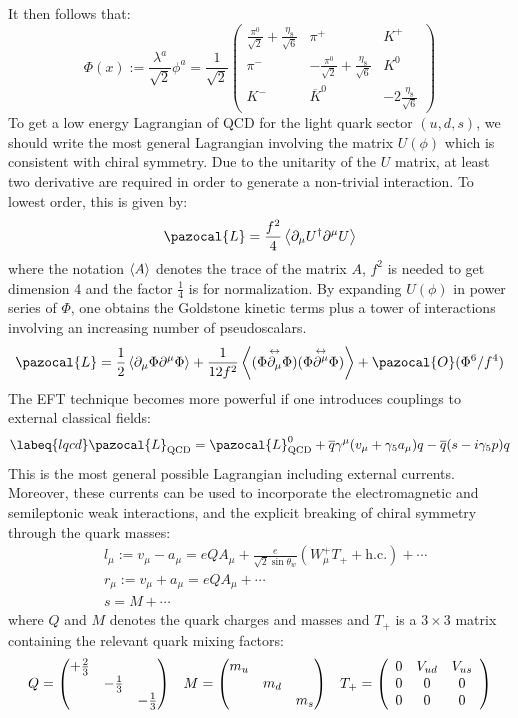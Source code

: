 \documentclass[../main.tex]{subfiles}
\begin{document}
It then follows that:
\[
\Phi(x):=\frac{\lambda^a}{\sqrt{2}}\phi^a=\frac{1}{\sqrt{2}}\left(\begin{array}{ccc}
    \frac{\pi^0}{\sqrt{2}}+\frac{\eta_8}{\sqrt{6}} & \pi^+ & K^+ \\
    \pi^- & -\frac{\pi^0}{\sqrt{2}}+\frac{\eta_8}{\sqrt{6}} & K^0 \\
    K^- & \overline{K}^0 & -2\frac{\eta_8}{\sqrt{6}}
\end{array}\right)
\]
To get a low energy Lagrangian of QCD for the light quark sector $(u, d, s)$, we should write the most general Lagrangian involving the matrix $U(\phi)$ which is consistent with chiral symmetry. Due to the unitarity of the $U$ matrix, at least two derivative are required in order to generate a non-trivial interaction. To lowest order, this is given by:
\[
\pazocal{L}=\frac{f^2}{4}\Braket{\partial_\mu U^\dagger\partial^\mu U}
\]
where the notation $\Braket{A}$ denotes the trace of the matrix $A$, $f^2$ is needed to get dimension 4 and the factor $\frac{1}{4}$ is for normalization. By expanding $U(\phi)$ in power series of $\Phi$, one obtains the Goldstone kinetic terms plus a tower of interactions involving an increasing number of pseudoscalars. 
\[
\pazocal{L}=\frac{1}{2}\Braket{\partial_\mu\Phi\partial^\mu\Phi}+\frac{1}{12f^2}\Braket{(\Phi\overset{\leftrightarrow}{\partial_\mu}\Phi)(\Phi\overset{\leftrightarrow}{\partial^\mu}\Phi)}+\pazocal{O}(\Phi^6/f^4)
\]
The EFT technique becomes more powerful if one introduces couplings to external classical fields:
\begin{equation}
\labeq{lqcd}
\pazocal{L}_{\text{QCD}}=\pazocal{L}_{\text{QCD}}^0+\overline{q}\gamma^\mu(v_\mu+\gamma_5a_\mu)q-\overline{q}(s-i\gamma_5p)q
\end{equation}
This is the most general possible Lagrangian including external currents. Moreover, these currents can be used to incorporate the electromagnetic and semileptonic weak interactions, and the explicit breaking of chiral symmetry through the quark masses:
\[
\begin{aligned}
&l_\mu:=v_\mu-a_\mu=eQA_\mu+\frac{e}{\sqrt{2}\sin\theta_w}(W_\mu^+ T_++\text{h.c.})+\cdots\\
&r_\mu:=v_\mu+a_\mu=eQA_\mu+\cdots\\
&s=M+\cdots
\end{aligned}
\]
where $Q$ and $M$ denotes the quark charges and masses and $T_+$ is a $3\times3$ matrix containing the relevant quark mixing factors:
\[
Q=\mqty(\dmat{+\frac{2}{3},-\frac{1}{3},-\frac{1}{3}}) \quad M=\mqty(\dmat{m_u,m_d,m_s}) \quad 
T_+=\left(\begin{array}{ccc}
    0 & V_{ud} & V_{us} \\
    0 & 0 & 0 \\
    0 & 0 & 0
\end{array}\right)
\]
\end{document}
